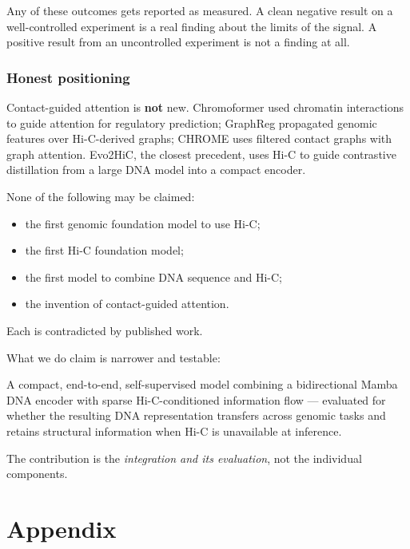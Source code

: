 \documentclass[11pt,a4paper]{article}
\begin{document}
\begin{plainbox}
Any of these outcomes gets reported as measured. A clean negative result on a
well-controlled experiment is a real finding about the limits of the signal. A
positive result from an uncontrolled experiment is not a finding at all.
\end{plainbox}

\section{Honest positioning}

Contact-guided attention is \textbf{not} new. Chromoformer used chromatin
interactions to guide attention for regulatory prediction; GraphReg propagated
genomic features over Hi-C-derived graphs; CHROME uses filtered contact graphs
with graph attention. Evo2HiC, the closest precedent, uses Hi-C to guide
contrastive distillation from a large DNA model into a compact encoder.

\begin{carefulbox}
None of the following may be claimed:
\begin{itemize}
\item the first genomic foundation model to use Hi-C;
\item the first Hi-C foundation model;
\item the first model to combine DNA sequence and Hi-C;
\item the invention of contact-guided attention.
\end{itemize}
Each is contradicted by published work.
\end{carefulbox}

What we do claim is narrower and testable:

\begin{tcolorbox}[colback=softgrey, colframe=deepblue, boxrule=0.6pt, arc=3pt]
A compact, end-to-end, self-supervised model combining a bidirectional Mamba DNA
encoder with sparse Hi-C-conditioned information flow --- evaluated for whether
the resulting DNA representation transfers across genomic tasks and retains
structural information when Hi-C is unavailable at inference.

\smallskip
The contribution is the \emph{integration and its evaluation}, not the individual
components.
\end{tcolorbox}

\appendix
\part*{Appendix}
\end{document}
